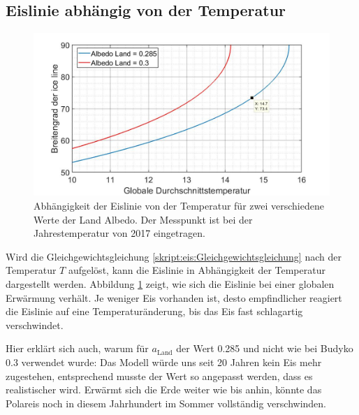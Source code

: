 \begin{refsection}
\subsection{Eislinie abhängig von der Temperatur}
\begin{figure}
	\centering
	\includegraphics[width=14cm]{eis/iceline_abh_von_der_Temperatur_mit_Verleich_albedo_0,3.jpg}
	\caption{Abhängigkeit der Eislinie von der Temperatur für zwei verschiedene Werte der Land Albedo. Der Messpunkt ist bei der Jahrestemperatur von 2017 eingetragen.}
	\label{skript:eis:fig:iceline_abh_von_der_Temperatur}
\end{figure}
Wird die Gleichgewichtsgleichung \eqref{skript:eis:Gleichgewichtsgleichung} nach der Temperatur $T$ aufgelöst, kann die Eislinie in Abhängigkeit der Temperatur dargestellt werden. Abbildung \ref{skript:eis:fig:iceline_abh_von_der_Temperatur} zeigt, wie sich die Eislinie bei einer globalen Erwärmung verhält. Je weniger Eis vorhanden ist, desto empfindlicher reagiert die Eislinie auf eine Temperaturänderung, bis das Eis fast schlagartig verschwindet.

Hier erklärt sich auch, warum für $a_\text{Land}$ der Wert 0.285 und nicht wie bei Budyko 0.3 verwendet wurde: Das Modell würde uns seit 20 Jahren kein Eis mehr zugestehen, entsprechend musste der Wert so angepasst werden, dass es realistischer wird. Erwärmt sich die Erde weiter wie bis anhin, könnte das Polareis noch in diesem Jahrhundert im Sommer vollständig verschwinden.

\end{refsection}
